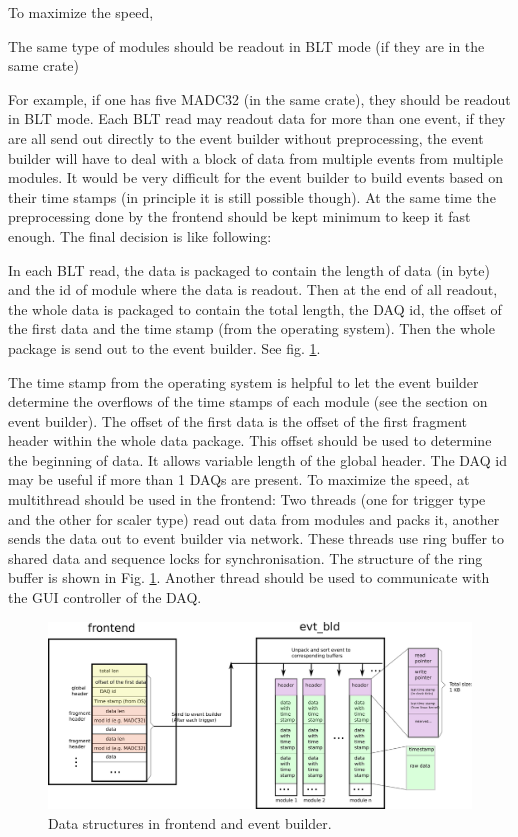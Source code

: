 \documentclass[a4paper,12pt]{article}
\begin{document}
	 To maximize the speed,
	 \begin{tcolorbox}
	 The same type of modules should be readout in BLT mode (if they are in
	 the same crate)
	 \end{tcolorbox}
	 For example, if one has five MADC32 (in the same crate), they should be
	 readout in BLT mode. Each BLT read may readout data for more than one
	 event, if they are all send out directly to the event builder without
	 preprocessing, the event builder will have to deal with a block of data
	 from multiple events from multiple modules.  It would be very difficult
	 for the event builder to build events based on their time stamps (in
	 principle it is still possible though). At the same time the
	 preprocessing done by the frontend should be kept minimum to keep it
	 fast enough. The final decision is like following:
	 \begin{tcolorbox}
		 In each BLT read, the data is packaged to contain the length of
		 data (in byte) and the id of module where the data is readout.
		 Then at the end of all readout, the whole data is packaged to
		 contain the total length,  the DAQ id, the offset of the first data
		 and the time stamp (from the operating system). Then the whole
		 package is send out to the event builder. See fig. \ref{fig03}.
	 \end{tcolorbox}
	 The time stamp from the operating system is helpful to let the event
	 builder determine the overflows of the time stamps of each module (see
	 the section on event builder). The offset of the first data is the
	 offset of the first fragment header within the whole data package. This
	 offset should be used to determine the beginning of data. It allows
	 variable length of the global header. The DAQ id may be useful if more
	 than 1 DAQs are present.
	 To maximize the speed, at multithread should be used in the
	 frontend: Two threads (one for trigger type and the other for scaler
	 type) read out data from modules and packs it, another sends
	 the data out to event builder via network. These threads use ring
	 buffer to shared data and sequence locks for synchronisation.
	 The structure of the ring buffer is shown in Fig. \ref{fig03}.
	 Another thread should be used to communicate with the GUI controller of
	 the DAQ. 





	\begin{figure}
		\begin{center}
			\includegraphics[width=.8\textwidth]{figs/data_format.eps}
			\caption{\label{fig03}Data structures in frontend and event
			builder. }
		\end{center}
	\end{figure}
\end{document}
